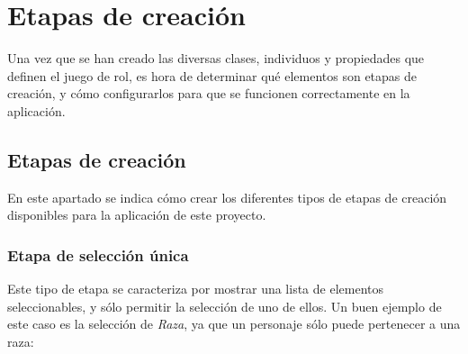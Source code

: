 
\section{Etapas de creación}
Una vez que se han creado las diversas clases, individuos y propiedades que definen el juego de rol, es hora de 
determinar qué elementos son etapas de creación, y cómo configurarlos para que se funcionen correctamente en la aplicación.

\subsection{Etapas de creación}
En este apartado se indica cómo crear los diferentes tipos de etapas de creación disponibles para la aplicación de este proyecto.

\subsubsection{Etapa de selección única}
Este tipo de etapa se caracteriza por mostrar una lista de elementos seleccionables, y sólo permitir la selección de uno de ellos.
Un buen ejemplo de este caso es la selección de \textit{Raza}, ya que un personaje sólo puede pertenecer a una raza:

